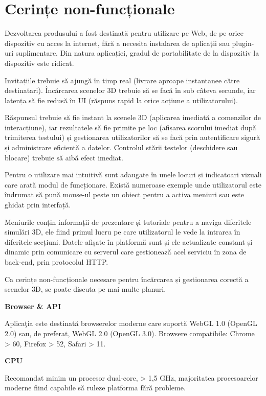 \section{Cerințe non-funcționale}
\label{sec:proj-non-functional-requirements}

Dezvoltarea produsului a fost destinată pentru utilizare pe Web, de pe orice dispozitiv cu acces la internet,
fără a necesita instalarea de aplicații sau plugin-uri suplimentare. Din natura aplicației, gradul de portabilitate
de la dispozitiv la dispozitiv este ridicat.


Invitațiile trebuie să ajungă în timp real (livrare aproape instantanee
către destinatari). Încărcarea scenelor 3D trebuie să se facă în sub câteva secunde, iar latența să fie redusă în UI
(răspuns rapid la orice acțiune a utilizatorului).

Răspunsul trebuie să fie instant la scenele 3D (aplicarea imediată a comenzilor de interacțiune), 
iar rezultatele să fie primite pe loc (afișarea scorului imediat
după trimiterea testului) și gestionarea utilizatorilor să se facă prin autentificare sigură și administrare
eficientă a datelor. Controlul stării testelor (deschidere sau blocare) trebuie să aibă efect imediat.

Pentru o utilizare mai intuitivă sunt adaugate în unele locuri și indicatoari vizuali care arată modul de funcționare.
Există numeroase exemple unde utilizatorul este îndrumat să pună mouse-ul peste un obiect
pentru a activa meniuri sau este ghidat prin interfață.


Meniurile conțin informații de prezentare și tutoriale pentru a naviga diferitele simulări 3D, ele fiind primul
lucru pe care utilizatorul le vede la intrarea în diferitele secțiuni. Datele afișate în platformă sunt și ele
actualizate constant și dinamic prin comunicare cu serverul care gestionează acel serviciu în zona de back-end,
prin protocolul HTTP.

Ca cerințe non-funcționale necesare pentru încărcarea și gestionarea corectă a scenelor 3D, se poate discuta pe 
mai multe planuri.

\textbf{Browser \& API}

Aplicaţia este destinată browserelor moderne care suportă WebGL 1.0 (OpenGL 2.0) sau, de preferat, 
WebGL 2.0 (OpenGL 3.0). Browsere compatibile: Chrome > 60, Firefox > 52, Safari > 11.

\textbf{CPU}

Recomandat minim un procesor dual-core, > 1,5 GHz, majoritatea procesoarelor moderne fiind capabile să ruleze platforma fără probleme.


